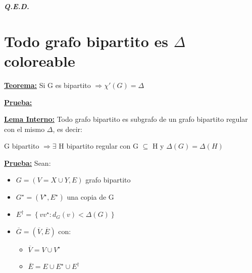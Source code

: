 \documentclass[12pt,a4paper]{report}
\newcommand{\QED}{\hfill \textit{\textbf{Q.E.D.}}}
\begin{document}
  		\QED

  	\section{Todo grafo bipartito es $\Delta$ coloreable}
  		\textbf{\underline{Teorema:}} Si G es bipartito $\Rightarrow \chi '(G) = \Delta $

  		\textbf{\underline{Prueba:}}

  			\vspace{3mm}
  			\underline{\textbf{Lema Interno:}} Todo grafo bipartito es subgrafo de un grafo bipartito regular con el mismo $\Delta$, es decir:
  				\begin{center}
  					G bipartito $\Rightarrow \exists$ H bipartito regular con G $\subseteq$ H y $\Delta(G) = \Delta(H)$
  				\end{center}

  				\underline{\textbf{Prueba:}} Sean:
  					\begin{itemize}
  						\item $G = (V = X \cup Y, E)$ grafo bipartito
  						\item $G^{\star} = (V^{\star}, E^{\star})$ una copia de G
  						\item $E^{\dag} = \left\lbrace vv^{\star} : d_{G}(v) < \Delta(G) \right\rbrace$
  						\item $\overline{G} = (\overline{V}, \overline{E})$ con:
  							\begin{itemize}
  								\item $\overline{V} = V \cup V^{\star}$
  								\item $\overline{E} = E \cup E^{\star} \cup E^{\dag}$
  							\end{itemize}
  					\end{itemize}
\end{document}

